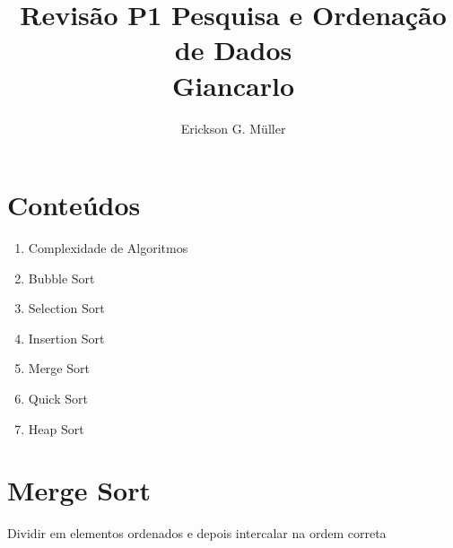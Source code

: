 \documentclass[•]{article}
\title{Revisão P1 Pesquisa e Ordenação de Dados\\Giancarlo}
\author{Erickson G. Müller}
\begin{document}
	\maketitle
	\section{Conteúdos}
		\begin{enumerate}
			\item Complexidade de Algoritmos
			\item Bubble Sort
			\item Selection Sort
			\item Insertion Sort
			\item Merge Sort
			\item Quick Sort
			\item Heap Sort
		\end{enumerate}
	\newpage
		
	\section{Merge Sort}	
		\begin{center}
			Dividir em elementos ordenados  e depois intercalar na ordem correta
		\end{center}
		
\end{document}
